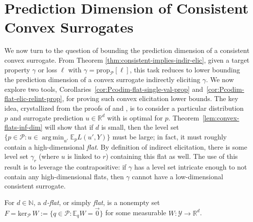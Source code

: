 \documentclass[anon,12pt]{colt2021} %
\newcommand{\Comments}{1}
\newcommand{\mytodo}[2]{\ifnum\Comments=1%
	\todo[linecolor=#1!80!black,backgroundcolor=#1,bordercolor=#1!80!black]{#2}\fi}
\newcommand{\jessiet}[1]{\mytodo{purple!20!white}{JF: #1}}
\newcommand{\reals}{\mathbb{R}}
\newcommand{\simplex}{\Delta_\Y}
\newcommand{\prop}[2][\mathcal{P}]{\mathrm{prop}_{#1}[#2]}
\newcommand{\spn}{\mathrm{span}}
\newcommand{\zeros}[1]{\mathrm{ker}_\P\,#1}
\newcommand{\affhull}{\mathrm{affhull}}
\newcommand{\E}{\mathbb{E}}
\renewcommand{\P}{\mathcal{P}}
\newcommand{\Y}{\mathcal{Y}}
\newcommand{\exploss}[3]{\E_{#3} #1(#2,Y)}
\DeclareMathOperator*{\argmin}{arg\,min}
\begin{document}
\section{Prediction Dimension of Consistent Convex Surrogates}\label{sec:char-convex}
We now turn to the question of bounding the prediction dimension of a consistent convex surrogate.
From Theorem \ref{thm:consistent-implies-indir-elic}, given a target property $\gamma$ or loss $\ell$ with $\gamma = \prop{\ell}$, this task reduces to lower bounding the prediction dimension of a convex surrogate indirectly eliciting $\gamma$.
We now explore two tools, Corollaries~\ref{cor:Pcodim-flat-single-val-prop} and~\ref{cor:Pcodim-flat-elic-relint-prop}, for proving such convex elicitation lower bounds.
The key idea, crystallized from the proofs of \citet[Theorem 16]{ramaswamy2016convex} and \citet[Theorem~9]{agarwal2015consistent}, is to consider a particular distribution~$p$ and surrogate prediction $u \in \reals^d$ with is optimal for $p$.
Theorem~\ref{lem:convex-flats-inf-dim} will show that if $d$ is small, then the level set $\{p \in \P : u \in \argmin_{u'} \exploss{L}{u'}{p}\}$ must be large; in fact, it must roughly contain a high-dimensional \emph{flat}.
By definition of indirect elicitation, there is some level set $\gamma_r$ (where $u$ is linked to $r$) containing this flat as well.
The use of this result is to leverage the contrapositive: if $\gamma$ has a level set intricate enough to not contain any high-dimensional flats, then $\gamma$ cannot have a low-dimensional consistent surrogate.


\begin{definition}[Flat]\label{def:flat-general}
  For $d\in\mathbb N$, a \emph{$d$-flat}, or simply \emph{flat}, is a nonempty set $F = \zeros{W} := \{q \in \P : \E_q W = \vec 0\}$ for some measurable $W:\Y \to \reals^d$.
\end{definition}
\end{document}
